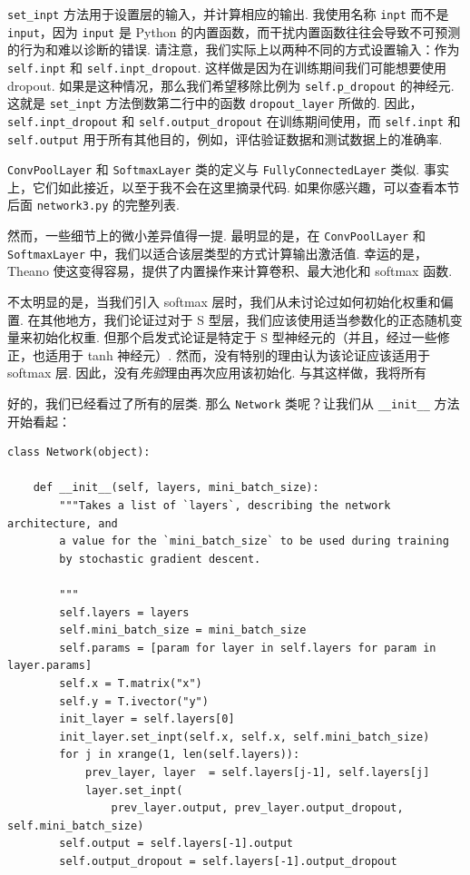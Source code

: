 \texttt{set\_\allowbreak{}inpt} 方法用于设置层的输入，并计算相应的输出. 我使用名称 \texttt{inpt} 而不是 \texttt{input}，因为 \texttt{input} 是 Python 的内置函数，而干扰内置函数往往会导致不可预测的行为和难以诊断的错误. 请注意，我们实际上以两种不同的方式设置输入：作为 \texttt{self.inpt} 和 \texttt{self.inpt\_\allowbreak{}dropout}. 这样做是因为在训练期间我们可能想要使用 dropout. 如果是这种情况，那么我们希望移除比例为 \texttt{self.p\_\allowbreak{}dropout} 的神经元. 这就是 \texttt{set\_\allowbreak{}inpt} 方法倒数第二行中的函数 \texttt{dropout\_\allowbreak{}layer} 所做的. 因此，\texttt{self.inpt\_\allowbreak{}dropout} 和 \texttt{self.output\_\allowbreak{}dropout} 在训练期间使用，而 \texttt{self.inpt} 和 \texttt{self.output} 用于所有其他目的，例如，评估验证数据和测试数据上的准确率.

\texttt{ConvPoolLayer} 和 \texttt{SoftmaxLayer} 类的定义与 \texttt{FullyConnectedLayer} 类似. 事实上，它们如此接近，以至于我不会在这里摘录代码. 如果你感兴趣，可以查看本节后面 \texttt{network3.py} 的完整列表.

然而，一些细节上的微小差异值得一提. 最明显的是，在 \texttt{ConvPoolLayer} 和 \texttt{SoftmaxLayer} 中，我们以适合该层类型的方式计算输出激活值. 幸运的是，Theano 使这变得容易，提供了内置操作来计算卷积、最大池化和 softmax 函数.

不太明显的是，当我们引入 softmax 层时，我们从未讨论过如何初始化权重和偏置. 在其他地方，我们论证过对于 S 型层，我们应该使用适当参数化的正态随机变量来初始化权重. 但那个启发式论证是特定于 S 型神经元的（并且，经过一些修正，也适用于 tanh 神经元）. 然而，没有特别的理由认为该论证应该适用于 softmax 层. 因此，没有\emph{先验}理由再次应用该初始化. 与其这样做，我将所有

好的，我们已经看过了所有的层类. 那么 \texttt{Network} 类呢？让我们从 \texttt{\_\allowbreak{}\_\allowbreak{}init\_\allowbreak{}\_\allowbreak{}} 方法开始看起：

\begin{lstlisting}
class Network(object):

    def __init__(self, layers, mini_batch_size):
        """Takes a list of `layers`, describing the network architecture, and
        a value for the `mini_batch_size` to be used during training
        by stochastic gradient descent.

        """
        self.layers = layers
        self.mini_batch_size = mini_batch_size
        self.params = [param for layer in self.layers for param in layer.params]
        self.x = T.matrix("x")
        self.y = T.ivector("y")
        init_layer = self.layers[0]
        init_layer.set_inpt(self.x, self.x, self.mini_batch_size)
        for j in xrange(1, len(self.layers)):
            prev_layer, layer  = self.layers[j-1], self.layers[j]
            layer.set_inpt(
                prev_layer.output, prev_layer.output_dropout, self.mini_batch_size)
        self.output = self.layers[-1].output
        self.output_dropout = self.layers[-1].output_dropout

\end{lstlisting}

